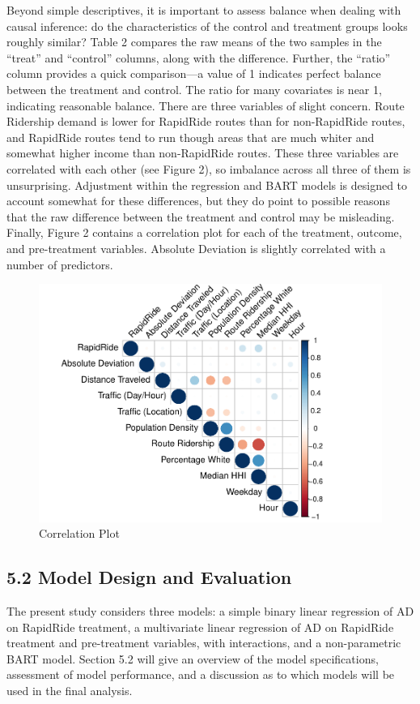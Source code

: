 \documentclass[
  12pt,
]{article}
\begin{document}
Beyond simple descriptives, it is important to assess balance when
dealing with causal inference: do the characteristics of the control and
treatment groups looks roughly similar? Table 2 compares the raw means
of the two samples in the ``treat'' and ``control'' columns, along with
the difference. Further, the ``ratio'' column provides a quick
comparison---a value of 1 indicates perfect balance between the
treatment and control. The ratio for many covariates is near 1,
indicating reasonable balance. There are three variables of slight
concern. Route Ridership demand is lower for RapidRide routes than for
non-RapidRide routes, and RapidRide routes tend to run though areas that
are much whiter and somewhat higher income than non-RapidRide routes.
These three variables are correlated with each other (see Figure 2), so
imbalance across all three of them is unsurprising. Adjustment within
the regression and BART models is designed to account somewhat for these
differences, but they do point to possible reasons that the raw
difference between the treatment and control may be misleading. Finally,
Figure 2 contains a correlation plot for each of the treatment, outcome,
and pre-treatment variables. Absolute Deviation is slightly correlated
with a number of predictors.

\begin{figure}

{\centering \includegraphics[width=0.6\linewidth]{figures/unnamed-chunk-9-1} 

}

\caption{Correlation Plot}\label{fig:unnamed-chunk-9}
\end{figure}

\subsection{5.2 Model Design and
Evaluation}\label{model-design-and-evaluation}

The present study considers three models: a simple binary linear
regression of AD on RapidRide treatment, a multivariate linear
regression of AD on RapidRide treatment and pre-treatment variables,
with interactions, and a non-parametric BART model. Section 5.2 will
give an overview of the model specifications, assessment of model
performance, and a discussion as to which models will be used in the
final analysis.
\end{document}
